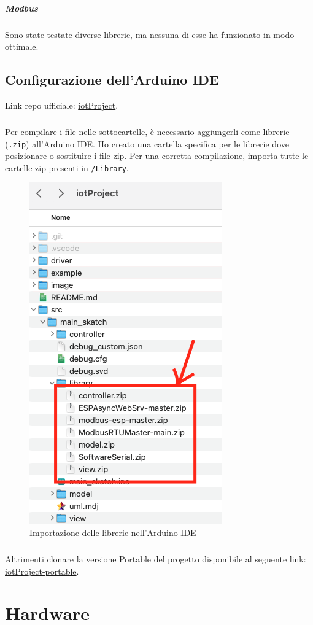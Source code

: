 \documentclass[12pt,a4paper]{report}
\begin{document}
\paragraph{Modbus} Sono state testate diverse librerie, ma nessuna di esse ha funzionato in modo ottimale.

\section{Configurazione dell'Arduino IDE}

Link repo ufficiale: \href{https://github.com/AlessioTommasi-supsi/iotProject }{iotProject}.

\paragraph{}
Per compilare i file nelle sottocartelle, è necessario aggiungerli come librerie (\texttt{.zip}) all'Arduino IDE. Ho creato una cartella specifica per le librerie dove posizionare o sostituire i file zip. Per una corretta compilazione, importa tutte le cartelle zip presenti in \texttt{/Library}.

\begin{figure}[H]
  \centering
  \includegraphics[width=0.3\linewidth]{../image/Library.png}
  \caption{Importazione delle librerie nell'Arduino IDE}
\end{figure}

\paragraph{} Altrimenti clonare la versione Portable del progetto disponibile al seguente link: \href{https://github.com/AlessioTommasi-supsi/iotProject/tree/portable}{iotProject-portable}.


\chapter{Hardware}
\end{document}
